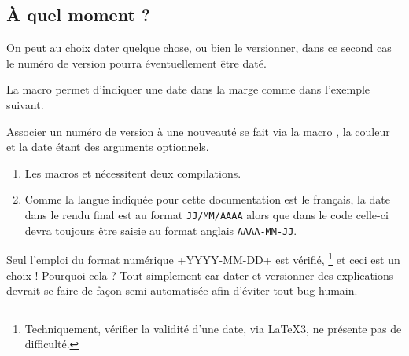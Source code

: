 \subsection{À quel moment ?}

On peut au choix dater quelque chose, ou bien le versionner, dans ce second cas le numéro de version pourra éventuellement être daté.




\begin{tdocexa}
    La macro  permet d'indiquer une date dans la marge comme dans l'exemple suivant.


\end{tdocexa}




\begin{tdocexa}
    Associer un numéro de version à une nouveauté se fait via la macro , la couleur et la date étant des arguments optionnels.


\end{tdocexa}


\begin{tdocimportant}
    \leavevmode

    \begin{enumerate}
        \item Les macros  et  nécessitent deux compilations.

        \item Comme la langue indiquée pour cette documentation est le français, la date dans le rendu final est au format \texttt{JJ/MM/AAAA} alors que dans le code celle-ci devra toujours être saisie au format anglais \texttt{AAAA-MM-JJ}.
    \end{enumerate}
\end{tdocimportant}


\begin{tdocwarn}
    Seul l'emploi du format numérique \tdocinlatex+YYYY-MM-DD+ est vérifié,
    \footnote{
        Techniquement, vérifier la validité d'une date, via \LaTeX3, ne présente pas de difficulté.
    }
    et ceci est un choix ! Pourquoi cela ? Tout simplement car dater et versionner des explications devrait se faire de façon semi-automatisée afin d'éviter tout bug humain.
\end{tdocwarn}


